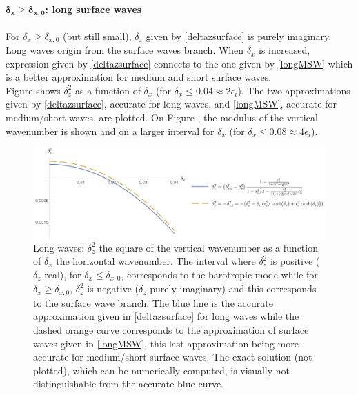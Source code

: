 \paragraph{$\boldsymbol{\delta_x \ge \delta_{x,0}}$: long surface waves}
For $\delta_x \ge \delta_{x,0}$ (but still small), $\delta_z$ given by \ref{deltazsurface} is purely imaginary. Long waves origin from the surface waves branch.
When $\delta_x$ is increased, expression given by \ref{deltazsurface} connects to the one given by \ref{longMSW} which is a better approximation for medium and short surface waves.\\
Figure  shows $\delta_z^2$ as a function of $\delta_x$ (for $\delta_x \le 0.04\approx 2\epsilon_i$). The two approximations given by \ref{deltazsurface}, accurate for long waves, and \ref{longMSW}, accurate for medium/short waves, are plotted. On Figure , the modulus of the vertical wavenumber is shown and on a larger interval for $\delta_x$ (for $\delta_x \le 0.08\approx 4\epsilon_i$).
\begin{figure}[h]
	\centerline{
		\includegraphics[width=0.9\linewidth]{FIGURES/dz2dx.png}
	}
\caption{Long waves: $\delta_z^2$ the square of the vertical wavenumber as a function of $\delta_x$ the horizontal wavenumber. The interval where $\delta_z^2$ is positive ($\delta_z$ real), for $\delta_x\le \delta_{x,0}$, corresponds to the barotropic mode while for $\delta_x\ge \delta_{x,0}$, $\delta_z^2$ is negative ($\delta_z$ purely imaginary) and this corresponds to the surface wave branch. The blue line is the accurate approximation given in \ref{deltazsurface} for long waves while the dashed orange curve corresponds to the approximation of surface waves given in \ref{longMSW}, this last approximation being more accurate for medium/short surface waves. The exact solution (not plotted), which can be numerically computed, is visually not distinguishable from the accurate blue curve.}
\label{dz2dx}
\end{figure}
